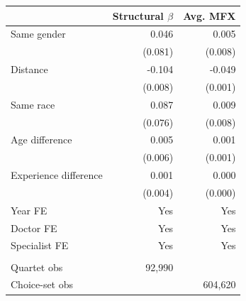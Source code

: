 
\begin{tabular}{lrr}
\toprule
 & Structural $\beta$ & Avg. MFX\\
\midrule
Same gender & 0.046 & 0.005\\
 & (0.081) & (0.008)\\
Distance & -0.104 & -0.049\\
 & (0.008) & (0.001)\\
Same race & 0.087 & 0.009\\
 & (0.076) & (0.008)\\
Age difference & 0.005 & 0.001\\
 & (0.006) & (0.001)\\
Experience difference & 0.001 & 0.000\\
 & (0.004) & (0.000)\\
\midrule
Year FE & Yes & Yes\\
Doctor FE & Yes & Yes\\
Specialist FE & Yes & Yes\\
\midrule\\
Quartet obs & 92,990 & \\
Choice-set obs &  & 604,620\\
\bottomrule
\end{tabular}
